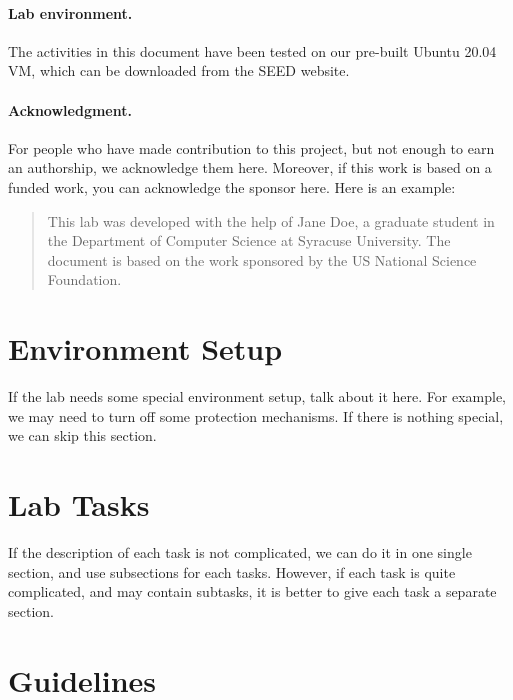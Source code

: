 \paragraph{Lab environment.} The activities in this document 
have been tested on our pre-built
Ubuntu 20.04 VM, which can be downloaded from the SEED website.  


\paragraph{Acknowledgment.} 
For people who have made contribution to this project, but 
not enough to earn an authorship, we acknowledge them here. 
Moreover, if this work is based on a funded work, you can
acknowledge the sponsor here. Here is an example:

\begin{quote}
This lab was developed with the help of Jane Doe, a graduate student
in the Department of Computer Science at Syracuse University.
The document is based on the work sponsored by the US National Science Foundation.
\end{quote}




\section{Environment Setup}

If the lab needs some special environment setup, talk about it here. 
For example, we may need to turn off some protection mechanisms. 
If there is nothing special, we can skip this section.



\section{Lab Tasks} 

If the description of each task is not complicated, we can 
do it in one single section, and use subsections for each
tasks. However, if each task is quite complicated, and may
contain subtasks, it is better to give each task a 
separate section. 




\section{Guidelines}

